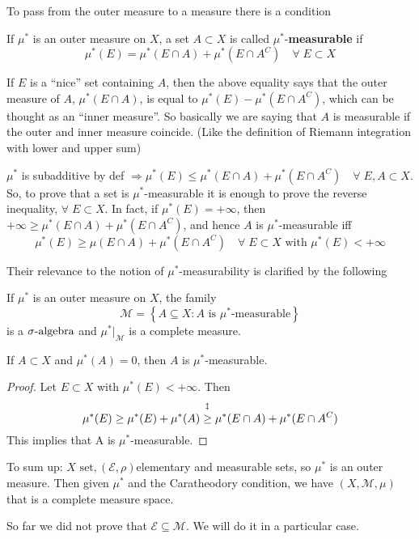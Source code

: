 To pass from the outer measure to a measure there is a condition 
\begin{definition}
    If \(\mu^*\) is an outer measure on \(X\), a set \(A \subset X\) is called \(\mu^*\)-\textbf{measurable} if 
    \[
        \mu^*(E) = \mu^*(E \cap A) + \mu^*(E \cap A^C) \quad \forall \; E \subset X
    \]
\end{definition}
\begin{remark}
    If \(E\) is a ``nice'' set containing \(A\), then the above equality says that the outer measure of \(A\), \(\mu^*(E \cap A)\), is equal to \(\mu^*(E) - \mu^*(E \cap A^C)\), which can be thought as an ``inner measure''. So basically we are saying that \(A\) is measurable if the outer and inner measure coincide. (Like the definition of Riemann integration with lower and upper sum)
\end{remark}
\begin{remark}
    \(\mu^*\) is subadditive by def \(\Rightarrow \mu^*(E) \leq \mu^*(E \cap A) + \mu^*(E \cap A^C) \quad \forall \; E, A \subset X\).  
    So, to prove that a set is \(\mu^*\)-measurable it is enough to prove the reverse inequality, \(\forall \; E \subset X\). In fact, if \(\mu^*(E) = +\infty\), then \(+\infty \geq \mu^*(E \cap A) + \mu^*(E \cap A^C)\), and hence \(A\) is \(\mu^*\)-measurable iff 
    \[
        \mu^*(E) \geq \mu(E \cap A) + \mu^*(E \cap A^C) \quad \forall \; E \subset X \mbox{ with } \mu^*(E) < +\infty
    \] 
\end{remark}
Their relevance to the notion of \(\mu^*\)-measurability is clarified by the following
\begin{theorem}[Caratheodory]
    If \(\mu^*\) is an outer measure on \(X\), the family
    \[
        \mathcal{M} = \left\lbrace A \subseteq X : A \mbox{ is }\mu^*\mbox{-measurable}\right\rbrace
    \]
    is a \(\sigma\mbox{-algebra}\) and \(\mu^*\vert_{\mathcal{M}}\) is a complete measure.
\end{theorem}
\begin{lemma}
    If \(A \subset X\) and \(\mu^*(A) = 0\), then \(A\) is \(\mu^*\)-measurable.
\end{lemma}
\begin{proof}
    Let \(E \subset X\) with \(\mu^*(E) < +\infty\). Then 
    \[
        \mu^*(E) \geq \mu^*(E) + \mu^*(A) \overset{\symbolfootnotemark[3]{\(E \cap A^C \subseteq E\) and \(E\cap A \subseteq A\) + monotonicity}}{\geq}  \mu^*(E \cap A) + \mu^*(E \cap A^C)
    \]
    This implies that A is \(\mu^*\)-measurable.
\end{proof}
To sum up: \(X \mbox{ set}, (\mathcal{E}, \rho)\)elementary and measurable sets, so \(\mu^*\) is an outer measure. Then given \(\mu^*\) and the Caratheodory condition, we have \((X, \mathcal{M}, \mu)\) that is a complete measure space.
\begin{remark}
    So far we did not prove that \(\mathcal{E} \subseteq \mathcal{M}\). We will do it in a particular case.
\end{remark}
